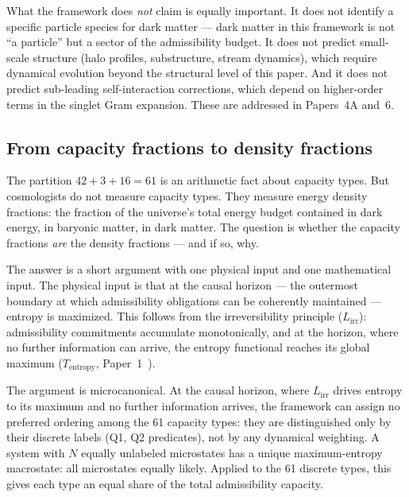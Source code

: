 \documentclass[11pt]{article}
\begin{document}
What the framework does \emph{not} claim is equally important.  It does not identify a specific particle species for dark matter --- dark matter in this framework is not ``a particle'' but a sector of the admissibility budget.  It does not predict small-scale structure (halo profiles, substructure, stream dynamics), which require dynamical evolution beyond the structural level of this paper.  And it does not predict sub-leading self-interaction corrections, which depend on higher-order terms in the singlet Gram expansion.  These are addressed in Papers~4A and~6.


\subsection{From capacity fractions to density fractions}

The partition $42 + 3 + 16 = 61$ is an arithmetic fact about capacity types.  But cosmologists do not measure capacity types.  They measure energy density fractions: the fraction of the universe's total energy budget contained in dark energy, in baryonic matter, in dark matter.  The question is whether the capacity fractions \emph{are} the density fractions --- and if so, why.

The answer is a short argument with one physical input and one mathematical input.  The physical input is that at the causal horizon --- the outermost boundary at which admissibility obligations can be coherently maintained --- entropy is maximized.  This follows from the irreversibility principle ($L_{\mathrm{irr}}$): admissibility commitments accumulate monotonically, and at the horizon, where no further information can arrive, the entropy functional reaches its global maximum ($T_{\mathrm{entropy}}$, Paper~1~\cite{BrookePaper1}).

The argument is microcanonical.  At the causal horizon, where $L_{\mathrm{irr}}$ drives entropy to its maximum and no further information arrives, the framework can assign no preferred ordering among the 61 capacity types: they are distinguished only by their discrete labels (Q1, Q2 predicates), not by any dynamical weighting.  A system with $N$ equally unlabeled microstates has a unique maximum-entropy macrostate: all microstates equally likely.  Applied to the 61 discrete types, this gives each type an equal share of the total admissibility capacity.
\end{document}
